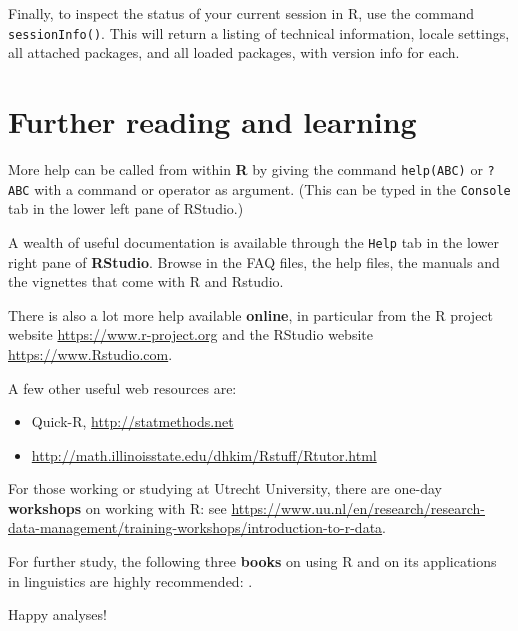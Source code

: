 \documentclass[]{book}
\begin{document}
Finally, to inspect the status of your current session in R, use the command \texttt{sessionInfo()}. This will return a listing of technical information, locale settings, all attached packages, and all loaded packages, with version info for each.

\hypertarget{sec:furtherreading}{%
\chapter{Further reading and learning}\label{sec:furtherreading}}

More help can be called from within \textbf{R} by giving the command
\texttt{help(ABC)} or \texttt{?ABC} with a
command or operator as argument.
(This can be typed in the \texttt{Console} tab in the lower left pane of RStudio.)

A wealth of useful documentation is available through the \texttt{Help} tab
in the lower right pane of \textbf{RStudio}. Browse in the FAQ files, the help files, the
manuals and the vignettes that come with R and Rstudio.

There is also a lot more help available \textbf{online}, in particular
from the R project website \url{https://www.r-project.org}
and the RStudio website \url{https://www.Rstudio.com}.

A few other useful web resources are:

\begin{itemize}
\item
  Quick-R, \url{http://statmethods.net}
\item
  \url{http://math.illinoisstate.edu/dhkim/Rstuff/Rtutor.html}
\end{itemize}

For those working or studying at Utrecht University,
there are one-day \textbf{workshops} on working with R: see
\url{https://www.uu.nl/en/research/research-data-management/training-workshops/introduction-to-r-data}.

For further study, the following three \textbf{books} on using R and on its
applications in linguistics are highly recommended:
\citep{baay08, john08, adler10}.

Happy analyses!


\end{document}
